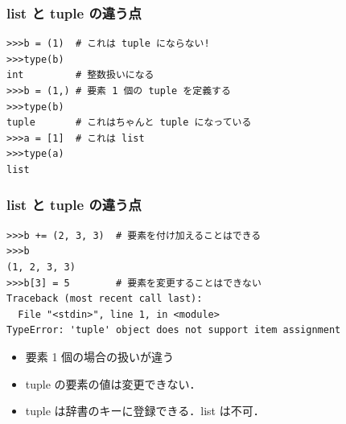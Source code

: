 \begin{frame}[t,fragile]
\frametitle{list と tuple の違う点}
\begin{lstlisting}
>>>b = (1)  # これは tuple にならない!
>>>type(b)
int         # 整数扱いになる
>>>b = (1,) # 要素 1 個の tuple を定義する
>>>type(b)
tuple       # これはちゃんと tuple になっている
>>>a = [1]  # これは list
>>>type(a)
list
\end{lstlisting}
\end{frame}

\begin{frame}[t,fragile]
\frametitle{list と tuple の違う点}
\begin{lstlisting}
>>>b += (2, 3, 3)  # 要素を付け加えることはできる
>>>b
(1, 2, 3, 3)
>>>b[3] = 5        # 要素を変更することはできない
Traceback (most recent call last):
  File "<stdin>", line 1, in <module>
TypeError: 'tuple' object does not support item assignment
\end{lstlisting}
\begin{itemize}
\item 要素 1 個の場合の扱いが違う
\item tuple の要素の値は変更できない．
\item tuple は辞書のキーに登録できる．list は不可．
\end{itemize}

\end{frame}

